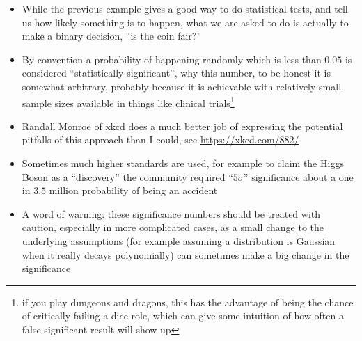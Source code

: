 \documentclass[english]{article}
\begin{document}
\begin{itemize}
\item While the previous example gives a good way to do statistical tests, and tell us how likely something is to happen, what we are asked to do is actually to make a binary decision, ``is the coin fair?''
\item By convention a probability of happening randomly which is less than $0.05$ is considered ``statistically significant'', why this number, to be honest it is somewhat arbitrary, probably because it is achievable with relatively small sample sizes available in things like clinical trials\footnote{if you play dungeons and dragons, this has the advantage of being the chance of critically failing a dice role, which can give some intuition of how often a false significant result will show up}
\item  Randall Monroe of xkcd does a much better job of expressing the potential pitfalls of this approach than I could, see \href{https://xkcd.com/882/}{https://xkcd.com/882/}
\item Sometimes much higher standards are used, for example to claim the Higgs Boson as a ``discovery'' the community required ``$5\sigma$'' significance about a one in $3.5$ million probability of being an accident
\item A word of warning: these significance numbers should be treated with caution, especially in more complicated cases, as a small change to the underlying assumptions (for example assuming a distribution is Gaussian when it really decays polynomially) can sometimes make a big change in the significance
\end{itemize}
\end{document}

